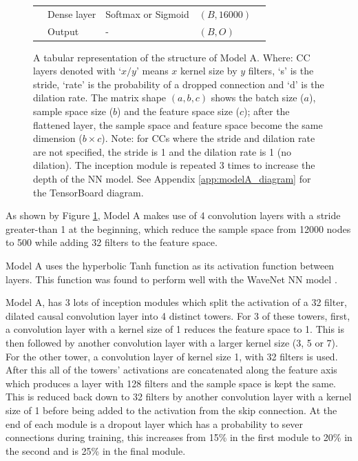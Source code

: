 \documentclass[12pt]{article}
\begin{document}
\begin{figure}[H]
\begin{scriptsize}
\begin{tabular}{l|l|l|l|l|l|l|l|l|}
                & \multicolumn{5}{|l|}{Dense layer}& Softmax or Sigmoid & $(B, 16000)$ &\\
                \cline{2-8}
                & \multicolumn{5}{|l|}{Output} & - & $(B, O)$ &\\
                \bottomrule
            \end{tabular}
        \end{scriptsize}
        \caption{\footnotesize{A tabular representation of the structure of Model A. Where: CC layers denoted with `$x/y$' means $x$ kernel size by $y$ filters, `s' is the stride, `rate' is the probability of a dropped connection and `d' is the dilation rate. The matrix shape $(a, b, c)$ shows the batch size ($a$), sample space size ($b$) and the feature space size ($c$); after the flattened layer, the sample space and feature space become the same dimension ($b\times c$). Note: for CCs where the stride and dilation rate are not specified, the stride is 1 and the dilation rate is 1 (no dilation). The inception module is repeated 3 times to increase the depth of the NN model. See Appendix \ref{app:modelA_diagram} for the TensorBoard diagram.}}
        \label{fig:modelA_structure}
    \end{figure}
    
    As shown by Figure \ref{fig:modelA_structure}, Model A makes use of 4 convolution layers with a stride greater-than 1 at the beginning, which reduce the sample space from 12000 nodes to 500 while adding 32 filters to the feature space.\medskip
    
    Model A uses the hyperbolic Tanh function as its activation function between layers. This function was found to perform well with the WaveNet NN model \parencite{Oord2016}.\medskip
    
    Model A, has 3 lots of inception modules which split the activation of a 32 filter, dilated causal convolution layer into 4 distinct towers. For 3 of these towers, first, a convolution layer with a kernel size of 1 reduces the feature space to 1. This is then followed by another convolution layer with a larger kernel size (3, 5 or 7). For the other tower, a convolution layer of kernel size 1, with 32 filters is used. After this all of the towers' activations are concatenated along the feature axis which produces a layer with 128 filters and the sample space is kept the same. This is reduced back down to 32 filters by another convolution layer with a kernel size of 1 before being added to the activation from the skip connection. At the end of each module is a dropout layer which has a probability to sever connections during training, this increases from 15\% in the first module to 20\% in the second and is 25\% in the final module.\medskip
    
\end{document}
